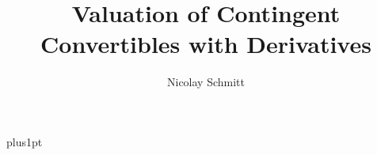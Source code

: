 \documentclass[12pt]{ociamthesis}  %
\title{Valuation of Contingent Convertibles with Derivatives}   %
\author{Nicolay Schmitt}             %
\begin{document}

\baselineskip=18pt plus1pt

\setcounter{tocdepth}{1}

\maketitle                  %


\begin{romanpages}          %
\tableofcontents            %
\listoffigures	 %
\listoftables
\end{romanpages}            %








\appendix
%

\renewcommand{\bibname}{References}
\end{document}

